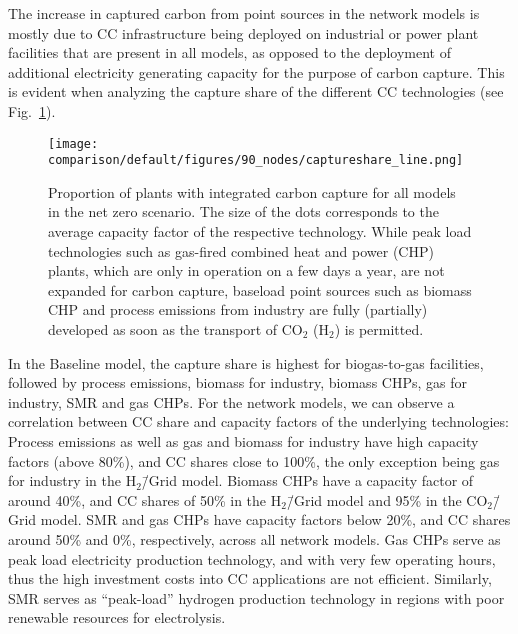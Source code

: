 \documentclass[twocolumn]{article}
\newcommand{\COtwo}{CO$_2$}
\newcommand{\Htwo}{H$_2$}
\newcommand{\modBase}{Baseline model}
\newcommand{\modCO}{CO$_2$\=/Grid model}
\newcommand{\modH}{H$_2$\=/Grid model}
\begin{document}
The increase in captured carbon from point sources in the network models is mostly due to CC infrastructure being deployed on industrial or power plant facilities that are present in all models, as opposed to the deployment of additional electricity generating capacity for the purpose of carbon capture. This is evident when analyzing the capture share of the different CC technologies (see Fig.~\ref{fig:captureshare_line}).


\begin{figure}[h]
    \centering
    \texttt{[image: comparison/default/figures/90\_nodes/captureshare\_line.png]}
    \caption{Proportion of plants with integrated carbon capture for all models in the net zero scenario. The size of the dots corresponds to the average capacity factor of the respective technology. While peak load technologies such as gas-fired combined heat and power (CHP) plants, which are only in operation on a few days a year, are not expanded for carbon capture, baseload point sources such as biomass CHP and process emissions from industry are fully (partially) developed as soon as the transport of \COtwo{} (\Htwo{}) is permitted.}
    \label{fig:captureshare_line}
\end{figure}%

In the \modBase{}, the capture share is highest for biogas-to-gas facilities, followed by process emissions, biomass for industry, biomass CHPs, gas for industry, SMR and gas CHPs. For the network models, we can observe a correlation between CC share and capacity factors of the underlying technologies: Process emissions as well as gas and biomass for industry have high capacity factors (above 80\%), and CC shares close to 100\%, the only exception being gas for industry in the \modH{}. Biomass CHPs have a capacity factor of around 40\%, and CC shares of 50\% in the \modH{} and 95\% in the \modCO{}. SMR and gas CHPs have capacity factors below 20\%, and CC shares around 50\% and 0\%, respectively, across all network models. Gas CHPs serve as peak load electricity production technology, and with very few operating hours, thus the high investment costs into CC applications are not efficient. Similarly, SMR serves as ``peak-load'' hydrogen production technology in regions with poor renewable resources for electrolysis.
\end{document}
